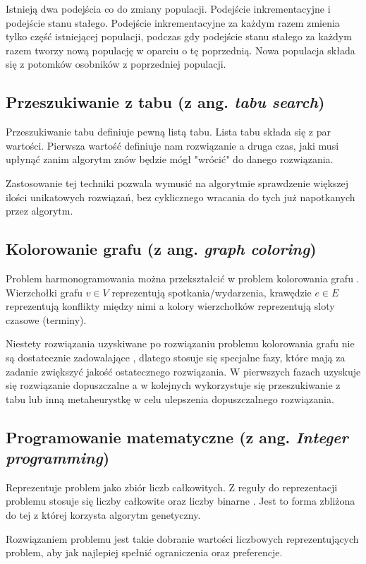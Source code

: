 Istnieją dwa podejścia co do zmiany populacji. Podejście inkrementacyjne i
podejście stanu stałego. Podejście inkrementacyjne za każdym razem zmienia tylko
część istniejącej populacji, podczas gdy podejście stanu stałego za każdym razem
tworzy nową populację w oparciu o tę poprzednią. Nowa populacja składa się z
potomków osobników z poprzedniej populacji.

\subsection{Przeszukiwanie z tabu (z ang. \emph{tabu search})}
Przeszukiwanie tabu definiuje pewną listą tabu. Lista tabu składa się z par
wartości. Pierwsza wartość definiuje nam rozwiązanie a druga czas, jaki musi
upłynąć zanim algorytm znów będzie mógł "wrócić" do danego rozwiązania.

Zastosowanie tej techniki pozwala wymusić na algorytmie sprawdzenie większej
ilości unikatowych rozwiązań, bez cyklicznego wracania do tych już napotkanych
przez algorytm.

\subsection{Kolorowanie grafu (z ang. \emph{graph coloring})}
Problem harmonogramowania można przekształcić w problem kolorowania grafu \cite{haan2006}.
Wierzchołki grafu $v \in V$ reprezentują spotkania/wydarzenia, krawędzie
$e \in E$ reprezentują konflikty między nimi a kolory wierzchołków reprezentują sloty czasowe
(terminy). 

Niestety rozwiązania uzyskiwane po rozwiązaniu problemu kolorowania grafu nie są
dostatecznie zadowalające \cite{haan2006}, dlatego stosuje się specjalne fazy, 
które mają za zadanie zwiększyć jakość ostatecznego rozwiązania. W pierwszych
fazach uzyskuje się rozwiązanie dopuszczalne a w kolejnych wykorzystuje się
przeszukiwanie z tabu lub inną metaheurystkę w celu ulepszenia dopuszczalnego
rozwiązania.

\subsection{Programowanie matematyczne (z ang. \emph{Integer programming})}
Reprezentuje problem jako zbiór liczb całkowitych. Z reguły do reprezentacji
problemu stosuje się liczby całkowite oraz liczby binarne
\cite{maaroufi2016mixed}. Jest to forma zbliżona do tej z której korzysta algorytm genetyczny.

Rozwiązaniem problemu jest takie dobranie wartości liczbowych reprezentujących
problem, aby jak najlepiej spełnić ograniczenia oraz preferencje.

